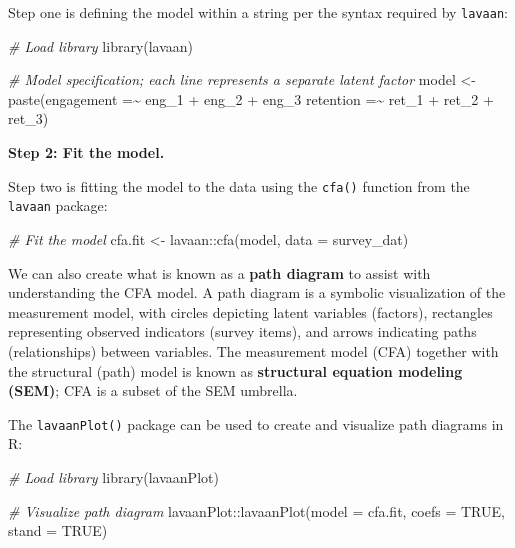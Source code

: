 \documentclass[
]{book}
\newenvironment{Shaded}{\begin{snugshade}}{\end{snugshade}}
\newcommand{\AttributeTok}[1]{\textcolor[rgb]{0.77,0.63,0.00}{#1}}
\newcommand{\CommentTok}[1]{\textcolor[rgb]{0.56,0.35,0.01}{\textit{#1}}}
\newcommand{\ConstantTok}[1]{\textcolor[rgb]{0.00,0.00,0.00}{#1}}
\newcommand{\FunctionTok}[1]{\textcolor[rgb]{0.00,0.00,0.00}{#1}}
\newcommand{\NormalTok}[1]{#1}
\newcommand{\OtherTok}[1]{\textcolor[rgb]{0.56,0.35,0.01}{#1}}
\newcommand{\SpecialCharTok}[1]{\textcolor[rgb]{0.00,0.00,0.00}{#1}}
\newcommand{\StringTok}[1]{\textcolor[rgb]{0.31,0.60,0.02}{#1}}
\begin{document}
Step one is defining the model within a string per the syntax required by \texttt{lavaan}:

\begin{Shaded}
\begin{Highlighting}[]
\CommentTok{\# Load library}
\FunctionTok{library}\NormalTok{(lavaan)}

\CommentTok{\# Model specification; each line represents a separate latent factor}
\NormalTok{model }\OtherTok{\textless{}{-}} \FunctionTok{paste}\NormalTok{(}\StringTok{\textquotesingle{}engagement =\textasciitilde{} eng\_1 + eng\_2 + eng\_3}
\StringTok{                retention =\textasciitilde{} ret\_1 + ret\_2 + ret\_3\textquotesingle{}}\NormalTok{)}
\end{Highlighting}
\end{Shaded}

\textbf{Step 2: Fit the model.}

Step two is fitting the model to the data using the \texttt{cfa()} function from the \texttt{lavaan} package:

\begin{Shaded}
\begin{Highlighting}[]
\CommentTok{\# Fit the model}
\NormalTok{cfa.fit }\OtherTok{\textless{}{-}}\NormalTok{ lavaan}\SpecialCharTok{::}\FunctionTok{cfa}\NormalTok{(model, }\AttributeTok{data =}\NormalTok{ survey\_dat)}
\end{Highlighting}
\end{Shaded}

We can also create what is known as a \textbf{path diagram} to assist with understanding the CFA model. A path diagram is a symbolic visualization of the measurement model, with circles depicting latent variables (factors), rectangles representing observed indicators (survey items), and arrows indicating paths (relationships) between variables. The measurement model (CFA) together with the structural (path) model is known as \textbf{structural equation modeling (SEM)}; CFA is a subset of the SEM umbrella.

The \texttt{lavaanPlot()} package can be used to create and visualize path diagrams in R:

\begin{Shaded}
\begin{Highlighting}[]
\CommentTok{\# Load library}
\FunctionTok{library}\NormalTok{(lavaanPlot)}

\CommentTok{\# Visualize path diagram}
\NormalTok{lavaanPlot}\SpecialCharTok{::}\FunctionTok{lavaanPlot}\NormalTok{(}\AttributeTok{model =}\NormalTok{ cfa.fit, }\AttributeTok{coefs =} \ConstantTok{TRUE}\NormalTok{, }\AttributeTok{stand =} \ConstantTok{TRUE}\NormalTok{)}
\end{Highlighting}
\end{Shaded}
\end{document}
